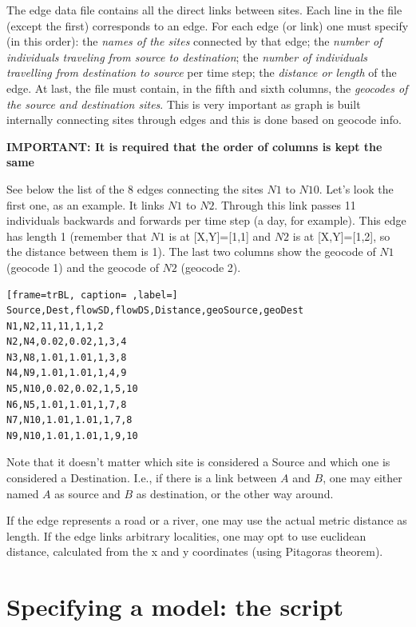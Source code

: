 The edge data file contains all the direct links between sites. Each line in the file (except the first) corresponds to an edge. For each edge (or link) one must specify (in this order): the \textit{names of the sites} connected by that edge; the \textit{number of individuals traveling from source to destination}; the \textit{number of individuals travelling from destination to source} per time step; the \textit{distance or length} of the edge. At last, the file must contain, in the fifth and sixth columns, the \textit{geocodes of the source and destination sites}. This is very important as graph is built internally connecting sites through edges and this is done based on geocode info. 

\vspace{1cm}
\textbf{IMPORTANT: It is required that the order of columns is kept the same}
\vspace{1cm}

See below the list of the 8 edges connecting the sites $N1$ to $N10$. Let's look the first one, as an example. It links $N1$ to $N2$. Through this link passes 11 individuals backwards and forwards per time step (a day, for example). This edge has length 1 (remember that $N1$ is at [X,Y]=[1,1] and $N2$ is at [X,Y]=[1,2], so the distance between them is 1). The last two columns show the geocode of $N1$ (geocode 1) and the geocode of $N2$ (geocode 2).

\begin{lstlisting}[frame=trBL, caption= ,label=]
Source,Dest,flowSD,flowDS,Distance,geoSource,geoDest
N1,N2,11,11,1,1,2
N2,N4,0.02,0.02,1,3,4
N3,N8,1.01,1.01,1,3,8
N4,N9,1.01,1.01,1,4,9
N5,N10,0.02,0.02,1,5,10
N6,N5,1.01,1.01,1,7,8
N7,N10,1.01,1.01,1,7,8
N9,N10,1.01,1.01,1,9,10
\end{lstlisting}

Note that it doesn't matter which site is considered a Source and which one is considered a Destination. I.e., if there is a link between $A$ and $B$, one may either named $A$ as source and $B$ as destination, or the other way around.

If the edge represents a road or a river, one may use the actual metric distance as length. If the edge links arbitrary localities, one may opt to use euclidean distance, calculated from the x and y coordinates (using Pitagoras theorem). 



\section{Specifying a model: the script}

